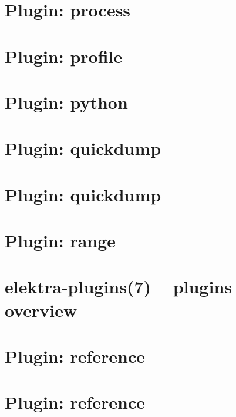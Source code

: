 \let\mypdfximage\pdfximage\def\pdfximage{\immediate\mypdfximage}\documentclass[twoside]{book}
\newcommand{\+}{\discretionary{\mbox{\scriptsize$\hookleftarrow$}}{}{}}
\begin{document}
\chapter{Plugin\+: process}
\label{md_src_plugins_process_README}

\chapter{Plugin\+: profile}
\label{md_src_plugins_profile_README}

\chapter{Plugin\+: python}
\label{md_src_plugins_python_README}

\chapter{Plugin\+: quickdump}
\label{md_src_plugins_quickdump_benchmarks}

\chapter{Plugin\+: quickdump}
\label{md_src_plugins_quickdump_README}

\chapter{Plugin\+: range}
\label{md_src_plugins_range_README}

\chapter{elektra-\/plugins(7) -- plugins overview}
\label{src_plugins_README_md}

\chapter{Plugin\+: reference}
\label{md_src_plugins_reference_examples_alternative_README}

\chapter{Plugin\+: reference}
\label{md_src_plugins_reference_examples_complex_README}

\end{document}
